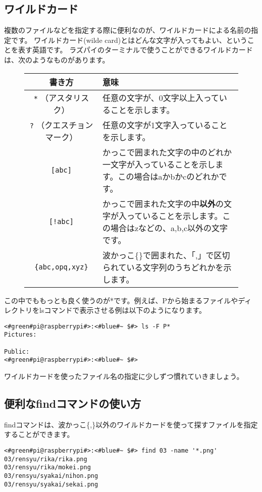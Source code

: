 \subsection{ワイルドカード}
複数のファイルなどを指定する際に便利なのが、ワイルドカードによる名前の指定です。
ワイルドカード(wilde card)とはどんな文字が入ってもよい、ということを表す英語です。
ラズパイのターミナルで使うことができるワイルドカードは、次のようなものがあります。
\newpage %
\begin{figure}[h]
    \begin{tabular}{cp{}} \hline
        書き方 & 意味 \\ \hline
        \texttt{*} （アスタリスク）  & 任意の文字が、0文字以上入っていることを示します。\\
        \texttt{?} （クエスチョンマーク） & 任意の文字が1文字入っていることを示します。\\
        \texttt{[abc]} & かっこで囲まれた文字の中のどれか一文字が入っていることを示します。この場合はaかbかcのどれかです。\\
        \texttt{[!abc]} & かっこで囲まれた文字の中{\bf 以外}の文字が入っていることを示します。この場合はzなどの、a,b,c以外の文字です。\\
        \texttt{\{abc,opq,xyz\}} & 波かっこ\{\}で囲まれた、「,」で区切られている文字列のうちどれかを示します。\\ \hline
    \end{tabular}
\end{figure}

この中でももっとも良く使うのが*です。例えば、Pから始まるファイルやディレクトリをlsコマンドで表示させる例は以下のようになります。
\begin{lstlisting}[caption=ワイルドカードの使い方, label=wildcard]
<#green#pi@raspberrypi#>:<#blue#~ $#> ls -F P*
Pictures:

Public:
<#green#pi@raspberrypi#>:<#blue#~ $#>
\end{lstlisting}

ワイルドカードを使ったファイル名の指定に少しずつ慣れていきましょう。

\subsection{便利なfindコマンドの使い方}
findコマンドは、波かっこ\{,\}以外のワイルドカードを使って探すファイルを指定することができます。

\begin{lstlisting}[caption=03ディレクトリからPNGファイルを探す, label=findwild]
<#green#pi@raspberrypi#>:<#blue#~ $#> find 03 -name '*.png'
03/rensyu/rika/rika.png
03/rensyu/rika/mokei.png
03/rensyu/syakai/nihon.png
03/rensyu/syakai/sekai.png
\end{lstlisting}

